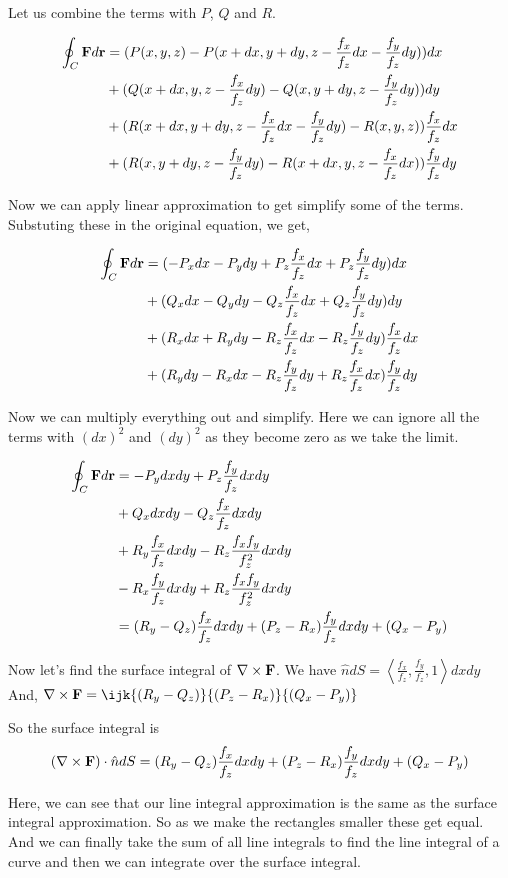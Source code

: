 Let us combine the terms with $P$, $Q$ and $R$.

\begin{align*}
\oint_C {\bf F} d{\bf r} 
    & = (P(x, y, z) - P(x + dx, y + dy, z -  \frac{f_x}{f_z} dx - \frac{f_y}{f_z} dy)) dx \\
    & + (Q(x + dx, y, z - \frac{f_x}{f_z} dy) - Q(x, y + dy, z - \frac{f_y}{f_z} dy)) dy \\
    & + (R(x + dx, y + dy, z - \frac{f_x}{f_z} dx - \frac{f_y}{f_z} dy) - R(x, y, z) ) \frac{f_x}{f_z} dx \\
    & + (R(x, y + dy, z - \frac{f_y}{f_z} dy) - R(x + dx, y, z - \frac{f_x}{f_z} dx)) \frac{f_y}{f_z} dy
\end{align*}

Now we can apply linear approximation  to get simplify some of the terms.
Substuting these in the original equation, we get,

\begin{align*}
\oint_C {\bf F} d{\bf r} 
    & = ( - P_x dx - P_y dy + P_z \frac{f_x}{f_z} dx + P_z \frac{f_y}{f_z} dy ) dx \\
    & + (Q_x dx - Q_y dy - Q_z \frac{f_x}{f_z} dx + Q_z \frac{f_y}{f_z} dy) dy \\
    & + (R_x dx + R_y dy - R_z \frac{f_x}{f_z} dx - R_z \frac{f_y}{f_z} dy) \frac{f_x}{f_z} dx \\
    & + (R_y dy - R_x dx - R_z \frac{f_y}{f_z} dy + R_z \frac{f_x}{f_z} dx) \frac{f_y}{f_z} dy
\end{align*}

Now we can multiply everything out and simplify. 
Here we can ignore all the terms with $(dx)^2$ and $(dy)^2$ as they become zero as we take the limit.

\begin{align*}
\oint_C {\bf F} d{\bf r} 
    & = -P_y dx dy + P_z \frac{f_y}{f_z} dx dy \\
    & + Q_x dx dy - Q_z \frac{f_x}{f_z} dx dy \\
    & + R_y \frac{f_x}{f_z} dx dy - R_z \frac{f_x f_y}{f_z^2} dx dy \\
    & - R_x \frac{f_y}{f_z} dx dy + R_z \frac{f_x f_y}{f_z^2} dx dy \\
    & = (R_y - Q_z) \frac{f_x}{f_z} dx dy 
    + (P_z - R_x) \frac{f_y}{f_z} dx dy 
    + (Q_x - P_y)
\end{align*}


Now let's find the surface integral of $\nabla \times {\bf F}$.
We have $\hat{n} dS = \left< \frac{f_x}{f_z}, \frac{f_y}{f_z}, 1 \right> dx dy$
And, $ \nabla \times {\bf F} = \ijk{(R_y - Q_z)}{(P_z - R_x)}{(Q_x - P_y)}$

So the surface integral is 
$$
(\nabla \times {\bf F}) \cdot \hat{n} dS = 
(R_y - Q_z) \frac{f_x}{f_z} dx dy +
(P_z - R_x) \frac{f_y}{f_z} dx dy + 
(Q_x - P_y)
$$

Here, we can see that our line integral approximation is the same as the surface integral approximation.
So as we make the rectangles smaller these get equal.
And we can finally take the sum of all line integrals to find the line integral of a curve
and then we can integrate over the surface integral.